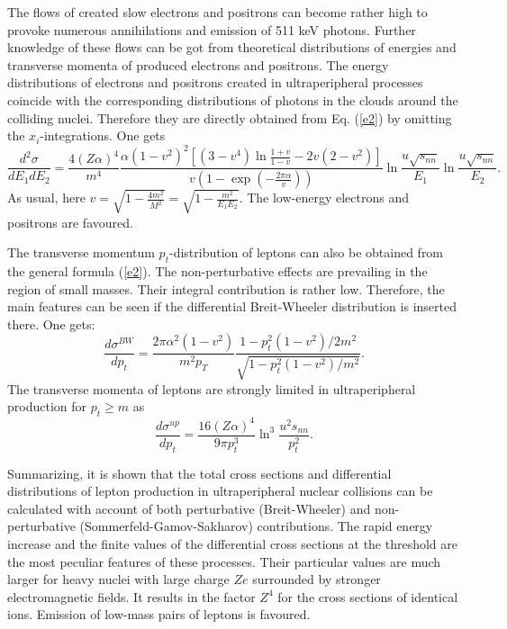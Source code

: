 \documentclass[12pt]{article}
\begin{document}
The flows of created slow electrons and
positrons can become rather high to provoke numerous annihilations and
emission of 511 keV photons. Further knowledge of these flows can be got
from theoretical distributions of energies and transverse momenta
of produced electrons and positrons.
The energy distributions of electrons and positrons created in ultraperipheral
processes coincide with the corresponding distributions of photons in the
clouds around the colliding nuclei. Therefore they are directly obtained from
 Eq. (\ref{e2}) by omitting the $x_i$-integrations. One gets
\begin{equation}
\frac {d^2\sigma }{dE_1dE_2}=\frac {4(Z\alpha )^4}{m^4}
\frac {\alpha (1-v^2)^2[(3-v^4)\ln \frac {1+v}{1-v}-2v(2-v^2)]}
 {v(1-\exp (-\frac {2\pi \alpha}{v}))}
 \ln \frac {u\sqrt {s_{nn}}}{E_1} \ln \frac {u\sqrt {s_{nn}}}{E_2}.
\label{sE}
\end{equation}
As usual, here $v=\sqrt {1-\frac {4m^2}{M^2}}=\sqrt {1-\frac {m^2}{E_1E_2}}$.
The low-energy electrons and positrons are favoured.
 
The transverse momentum $p_t$-distribution of leptons can also be obtained from 
the general formula (\ref{e2}). The non-perturbative effects are prevailing
in the region of small masses. Their integral contribution is rather low.
Therefore, the main features can be seen if the differential Breit-Wheeler 
distribution is inserted there. One gets:
\begin{equation}
\frac {d\sigma ^{BW}}{dp_t}=\frac {2\pi \alpha ^2 (1-v^2)}{m^2p_T}
\frac {1-p^2_t(1-v^2)/2m^2}{\sqrt {1-p^2_t(1-v^2)/m^2}}.
\label{p_t}
\end{equation}
The transverse momenta of leptons are strongly limited in ultraperipheral 
production for $p_t\geq m$ as
\begin{equation}
\frac {d\sigma ^{up}}{dp_t}=\frac {16(Z\alpha )^4}{9\pi p^3_t}
\ln ^3\frac {u^2s_{nn}}{p^2_t}.
\label{sp_t}
\end{equation}

Summarizing, it is shown that the total cross sections and differential
distributions of lepton production in ultraperipheral nuclear collisions
can be calculated with account of both perturbative (Breit-Wheeler) and
non-perturbative (Sommerfeld-Gamov-Sakharov) contributions. The rapid energy
increase and the finite values of the differential cross sections at the 
threshold are the most peculiar features of these processes. Their particular 
values are much larger for heavy nuclei with large charge $Ze$ surrounded by 
stronger electromagnetic fields. It results in the factor $Z^4$ for the  
cross sections of identical ions. Emission of low-mass pairs of leptons is
favoured.
\end{document}
